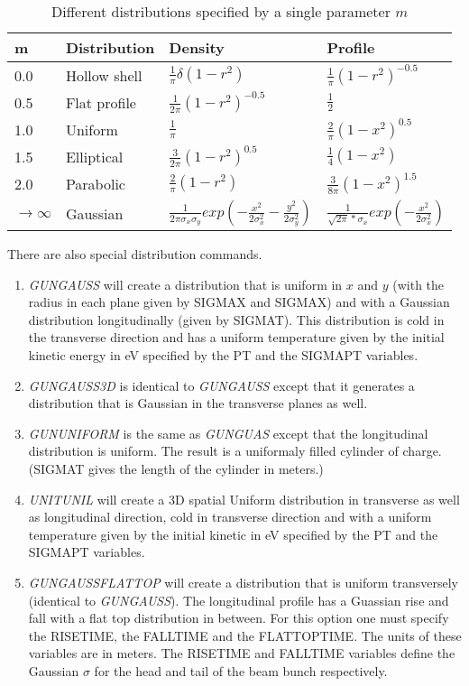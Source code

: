 \begin{table}[h!]
\begin{flushleft} \footnotesize
 \begin{tabular}{|l|l|l|l|}
\hline
\bf m & \bf Distribution & \bf Density & \bf Profile \\
\hline
0.0 & Hollow shell  & $\frac{1}{\pi}\delta(1-r^2)$ &$\frac{1}{\pi}(1-r^2)^{-0.5}$\\
\hline
0.5 & Flat profile  & $\frac{1}{2\pi}(1-r^2)^{-0.5}$ & $\frac{1}{2}$\\
\hline
1.0 & Uniform  & $\frac{1}{\pi}$ & $\frac{2}{\pi}(1-x^2)^{0.5}$\\
\hline
1.5 & Elliptical  & $\frac{3}{2\pi}(1-r^2)^{0.5}$ & $\frac{1}{4}(1-x^2)$ \\
\hline
2.0 & Parabolic  & $\frac{2}{\pi}(1-r^2)$ & $\frac{3}{8\pi}(1-x^2)^{1.5}$ \\
\hline
$\rightarrow \infty$ & Gaussian  & $\frac{1}{2\pi\sigma_x\sigma_y}exp(-\frac{x^2}{2\sigma_x^2} -\frac{y^2}{2\sigma_y^2})$ & 
                       $\frac{1}{\sqrt{2\pi}*\sigma_x}exp(-\frac{x^2}{2\sigma_x^2}) $ \\
\hline
\end{tabular}
\end{flushleft} 
\caption{\label{tab:binomdist}{Different distributions specified by a single parameter $m$}}
\end{table}
There are also special distribution commands.
\begin{enumerate}
\item {\it GUNGAUSS} will create a distribution that is uniform in $x$ and $y$ (with the
radius in each plane given by SIGMAX and SIGMAX) and with a Gaussian distribution longitudinally (given by SIGMAT).
This distribution is cold in the transverse direction and has a uniform temperature given by the initial kinetic energy in
eV specified by the PT and the SIGMAPT variables.
\item {\it GUNGAUSS3D} is identical to {\it GUNGAUSS} except that it generates a distribution that is Gaussian in the
transverse planes as well.
\item {\it GUNUNIFORM} is the same as {\it GUNGUAS} except that the longitudinal distribution is uniform. The result is a
uniformaly filled cylinder of charge. (SIGMAT gives the length of the cylinder in meters.)
\item {\it UNITUNIL} will create a 3D spatial Uniform distribution in transverse as well as longitudinal direction, cold
in transverse direction and with a uniform temperature given by the initial kinetic in eV specified by the PT and the SIGMAPT variables.
\item {\it GUNGAUSSFLATTOP} will create a distribution that is uniform transversely (identical to {\it GUNGAUSS}). The longitudinal profile
has a Guassian rise and fall with a flat top distribution in between. For this option one must specify the RISETIME, the FALLTIME and the
FLATTOPTIME. The units of these variables are in meters. The RISETIME and FALLTIME variables define the Gaussian $\sigma$ for the
head and tail of the beam bunch respectively.   
\end{enumerate}

